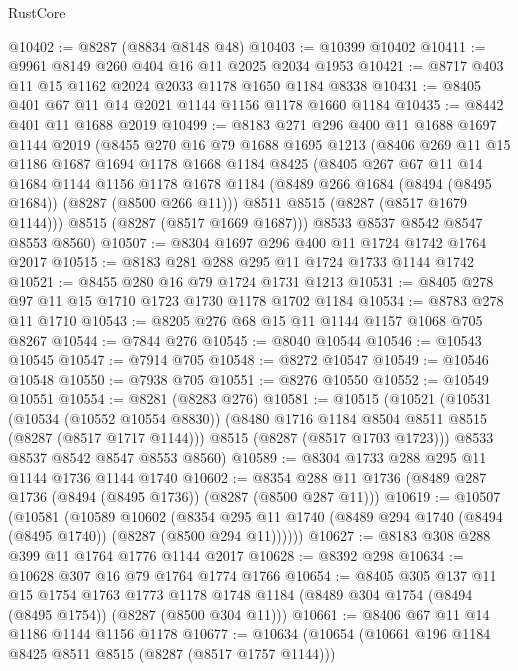 \begin{lexlean}{RustCore}
\begin{coremodule}
@10402 := @8287 (@8834 @8148 @48)
@10403 := @10399 @10402
@10411 := @9961 @8149 @260 @404 @16 @11 @2025 @2034 @1953
@10421 := @8717 @403 @11 @15 @1162 @2024 @2033 @1178 @1650 @1184 @8338
@10431 := @8405 @401 @67 @11 @14 @2021 @1144 @1156 @1178 @1660 @1184
@10435 := @8442 @401 @11 @1688 @2019
@10499 := @8183
    @271
    @296
    @400
    @11
    @1688
    @1697
    @1144
    @2019
    (@8455
      @270
      @16
      @79
      @1688
      @1695
      @1213
      (@8406
        @269
        @11
        @15
        @1186
        @1687
        @1694
        @1178
        @1668
        @1184
        @8425
        (@8405
          @267
          @67
          @11
          @14
          @1684
          @1144
          @1156
          @1178
          @1678
          @1184
          (@8489 @266 @1684 (@8494 (@8495 @1684)) (@8287 (@8500 @266 @11)))
          @8511
          @8515
          (@8287 (@8517 @1679 @1144)))
        @8515
        (@8287 (@8517 @1669 @1687)))
      @8533
      @8537
      @8542
      @8547
      @8553
      @8560)
@10507 := @8304 @1697 @296 @400 @11 @1724 @1742 @1764 @2017
@10515 := @8183 @281 @288 @295 @11 @1724 @1733 @1144 @1742
@10521 := @8455 @280 @16 @79 @1724 @1731 @1213
@10531 := @8405 @278 @97 @11 @15 @1710 @1723 @1730 @1178 @1702 @1184
@10534 := @8783 @278 @11 @1710
@10543 := @8205 @276 @68 @15 @11 @1144 @1157 @1068 @705 @8267
@10544 := @7844 @276
@10545 := @8040 @10544
@10546 := @10543 @10545
@10547 := @7914 @705
@10548 := @8272 @10547
@10549 := @10546 @10548
@10550 := @7938 @705
@10551 := @8276 @10550
@10552 := @10549 @10551
@10554 := @8281 (@8283 @276)
@10581 := @10515
    (@10521
      (@10531
        (@10534 (@10552 @10554 @8830))
        (@8480 @1716 @1184 @8504 @8511 @8515 (@8287 (@8517 @1717 @1144)))
        @8515
        (@8287 (@8517 @1703 @1723)))
      @8533
      @8537
      @8542
      @8547
      @8553
      @8560)
@10589 := @8304 @1733 @288 @295 @11 @1144 @1736 @1144 @1740
@10602 := @8354 @288 @11 @1736 (@8489 @287 @1736 (@8494 (@8495 @1736)) (@8287 (@8500 @287 @11)))
@10619 := @10507
    (@10581
      (@10589
        @10602
        (@8354 @295 @11 @1740 (@8489 @294 @1740 (@8494 (@8495 @1740)) (@8287 (@8500 @294 @11))))))
@10627 := @8183 @308 @288 @399 @11 @1764 @1776 @1144 @2017
@10628 := @8392 @298
@10634 := @10628 @307 @16 @79 @1764 @1774 @1766
@10654 := @8405
    @305
    @137
    @11
    @15
    @1754
    @1763
    @1773
    @1178
    @1748
    @1184
    (@8489 @304 @1754 (@8494 (@8495 @1754)) (@8287 (@8500 @304 @11)))
@10661 := @8406 @67 @11 @14 @1186 @1144 @1156 @1178
@10677 := @10634
    (@10654
      (@10661 @196 @1184 @8425 @8511 @8515 (@8287 (@8517 @1757 @1144)))

\end{coremodule}
\end{lexlean}

